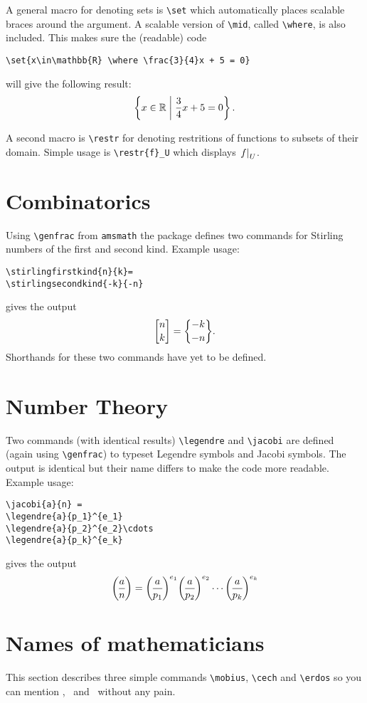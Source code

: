 \documentclass[12pt,a4paper]{article}
\begin{document}
A general macro for denoting sets is \verb|\set| which automatically places scalable braces around the argument.
A scalable version of \verb|\mid|, called \verb|\where|, is also included.
This makes sure the (readable) code
\begin{verbatim}
\set{x\in\mathbb{R} \where \frac{3}{4}x + 5 = 0}
\end{verbatim}
will give the following result:
\[\left\{x\in\mathbb{R} \mathrel{}\middle|\mathrel{} \frac{3}{4}x + 5 = 0\right\}.\]

A second macro is \verb|\restr| for denoting restritions of functions to subsets of their domain.
Simple usage is \verb|\restr{f}_U| which displays $\left.f\right|_U$.



\section{Combinatorics}

Using \verb|\genfrac| from \verb|amsmath| the package defines two commands for Stirling numbers of the first and second kind.
Example usage:
\begin{verbatim}
\stirlingfirstkind{n}{k}=
\stirlingsecondkind{-k}{-n}
\end{verbatim}
gives the output
\[
\stirlingfirstkind{n}{k}=
\stirlingsecondkind{-k}{-n}.
\]
Shorthands for these two commands have yet to be defined.

\section{Number Theory}
Two commands (with identical results) \verb|\legendre| and \verb|\jacobi| are defined (again using \verb|\genfrac|) to typeset Legendre symbols and Jacobi symbols.
The output is identical but their name differs to make the code more readable.
Example usage:
\begin{verbatim}
\jacobi{a}{n} =
\legendre{a}{p_1}^{e_1}
\legendre{a}{p_2}^{e_2}\cdots 
\legendre{a}{p_k}^{e_k}
\end{verbatim}
gives the output
\[
\jacobi{a}{n} =
\legendre{a}{p_1}^{e_1}
\legendre{a}{p_2}^{e_2}\cdots 
\legendre{a}{p_k}^{e_k}
\]

\section{Names of mathematicians}
This section describes three simple commands \verb|\mobius|, \verb|\cech| and \verb|\erdos| so you can mention \mobius, \cech\ and \erdos\ without any pain.
\end{document}
